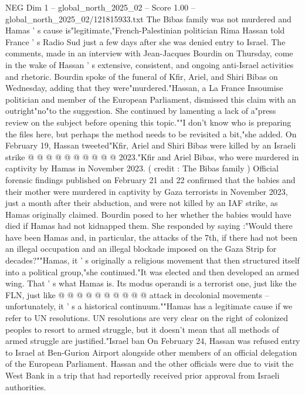 \begin{textsample}{NEG Dim 1 – global\_north\_2025\_02 – Score 1.00 – global\_north\_2025\_02/121815933.txt}  \label{ex:f1_neg_003}
The Bibas family was not murdered and Hamas ' s cause is"legitimate,"French-Palestinian politician Rima Hassan told France ' s Radio Sud just a few days after she was denied entry to Israel.
The comments, made in an interview with Jean-Jacques Bourdin on Thursday, come in the wake of Hassan ' s extensive, consistent, and ongoing anti-Israel activities and rhetoric.
Bourdin spoke of the funeral of Kfir, Ariel, and Shiri Bibas on Wednesday, adding that they were"murdered."Hassan, a La France Insoumise politician and member of the European Parliament, dismissed this claim with an outright"no"to the suggestion.
She continued by lamenting a lack of a"press review on the subject before opening this topic.""I don't know who is preparing the files here, but perhaps the method needs to be revisited a bit,"she added.
On February 19, Hassan tweeted"Kfir, Ariel and Shiri Bibas were killed by an Israeli strike @ @ @ @ @ @ @ @ @ @ 2023."Kfir and Ariel Bibas, who were murdered in captivity by Hamas in November 2023. ( credit : The Bibas family ) Official forensic findings published on February 21 and 22 confirmed that the babies and their mother were murdered in captivity by Gaza terrorists in November 2023, just a month after their abduction, and were not killed by an IAF strike, as Hamas originally claimed.
Bourdin posed to her whether the babies would have died if Hamas had not kidnapped them.
She responded by saying :"Would there have been Hamas and, in particular, the attacks of the 7th, if there had not been an illegal occupation and an illegal blockade imposed on the Gaza Strip for decades?""Hamas, it ' s originally a religious movement that then structured itself into a political group,"she continued."It was elected and then developed an armed wing.
That ' s what Hamas is.
Its modus operandi is a terrorist one, just like the FLN, just like @ @ @ @ @ @ @ @ @ @ attack in decolonial movements -- unfortunately, it ' s a historical continuum.""Hamas has a legitimate cause if we refer to UN resolutions.
UN resolutions are very clear on the right of colonized peoples to resort to armed struggle, but it doesn't mean that all methods of armed struggle are justified."Israel ban On February 24, Hassan was refused entry to Israel at Ben-Gurion Airport alongside other members of an official delegation of the European Parliament.
Hassan and the other officials were due to visit the West Bank in a trip that had reportedly received prior approval from Israeli authorities.

\end{textsample}
